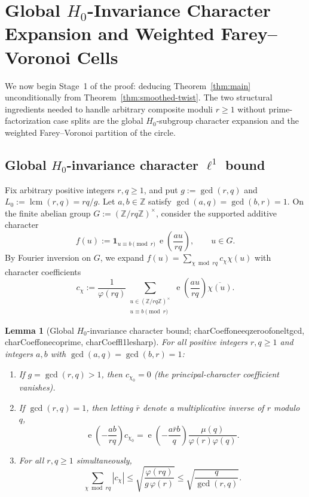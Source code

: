 \documentclass[11pt,reqno]{amsart}
\numberwithin{equation}{section}
\newtheorem{lemma}[theorem]{Lemma}
\theoremstyle{definition}
\newcommand{\Z}{\mathbb{Z}}
\newcommand{\1}{\mathbf{1}}
\newcommand{\e}{\operatorname{e}}
\DeclareMathOperator{\lcm}{lcm}
\newcommand{\lean}[1]{{\footnotesize\ttfamily\renewcommand{\_}{\textunderscore\allowbreak}#1}}
\begin{document}
\section{Global \texorpdfstring{$H_0$}{H0}-Invariance Character Expansion and Weighted Farey--Voronoi Cells}
\label{sec:char-voronoi}

We now begin Stage~1 of the proof: deducing Theorem~\ref{thm:main} unconditionally from Theorem~\ref{thm:smoothed-twist}. The two structural ingredients needed to handle arbitrary composite moduli $r \ge 1$ without prime-factorization case splits are the global $H_0$-subgroup character expansion and the weighted Farey--Voronoi partition of the circle.

\subsection{Global \texorpdfstring{$H_0$}{H0}-invariance character \texorpdfstring{$\ell^1$}{l1} bound}

Fix arbitrary positive integers $r, q \ge 1$, and put $g := \gcd(r, q)$ and $L_0 := \lcm(r, q) = rq/g$. Let $a, b \in \Z$ satisfy $\gcd(a, q) = \gcd(b, r) = 1$. On the finite abelian group $G := (\Z/rq\Z)^\times$, consider the supported additive character
\[
  f(u) := \1_{u \equiv b \pmod r}\, \e\!\left(\frac{a u}{r q}\right), \qquad u \in G.
\]
By Fourier inversion on $G$, we expand $f(u) = \sum_{\chi \bmod rq} c_\chi \chi(u)$ with character coefficients
\begin{equation}\label{eq:char-coeff}
  c_\chi := \frac{1}{\varphi(rq)} \sum_{\substack{u \in (\Z/rq\Z)^\times \\ u \equiv b \pmod r}} \e\!\left(\frac{a u}{r q}\right)\overline{\chi(u)}.
\end{equation}

\begin{lemma}[Global $H_0$-invariance character bound; \lean{charCoeff\_one\_eq\_zero\_of\_one\_lt\_gcd}, \lean{charCoeff\_one\_coprime}, \lean{charCoeff\_l1\_le\_sharp}]
\label{lem:char-l1}
For all positive integers $r, q \ge 1$ and integers $a, b$ with $\gcd(a, q) = \gcd(b, r) = 1$:
\begin{enumerate}[label=(\alph*)]
  \item If $g = \gcd(r, q) > 1$, then $c_{\chi_0} = 0$ (the principal-character coefficient vanishes).
  \item If $\gcd(r, q) = 1$, then letting $\bar{r}$ denote a multiplicative inverse of $r$ modulo~$q$,
  \[
    \e\!\left(-\frac{a b}{r q}\right) c_{\chi_0}
    = \e\!\left(-\frac{a \bar{r} b}{q}\right)\frac{\mu(q)}{\varphi(r)\varphi(q)}.
  \]
  \item For all $r, q \ge 1$ simultaneously,
  \begin{equation}\label{eq:char-l1-sharp}
    \sum_{\chi \bmod rq} |c_\chi|
    \le \sqrt{\frac{\varphi(rq)}{g\,\varphi(r)}}
    \le \sqrt{\frac{q}{\gcd(r, q)}}.
  \end{equation}
\end{enumerate}
\end{lemma}
\end{document}
